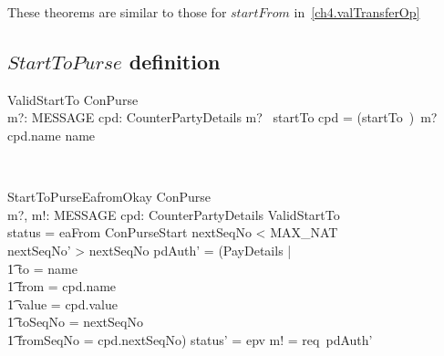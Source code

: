 These theorems are similar to those for $startFrom$ in~\ref{ch4.valTransferOp}
%



\subsection*{$StartToPurse$ definition}

\begin{LSDef}
\begin{schema}{ValidStartTo}
   ConPurse \\
   m?: MESSAGE
   \also
   cpd: CounterPartyDetails
\where
   m? \in \ran~startTo
   \also
   cpd = (startTo~\inv)~m?
   \also
   cpd.name \neq name
\end{schema}~\end{LSDef}

\begin{LSDef}
\begin{schema}{StartToPurseEafromOkay}
   \Delta ConPurse \\
   m?, m!: MESSAGE
   \also
   cpd: CounterPartyDetails
\where
   ValidStartTo \\
   status = eaFrom
   \also
   \Xi ConPurseStart
   \also
   nextSeqNo < MAX\_NAT \\
   nextSeqNo' > nextSeqNo
   \also
   pdAuth' = (\mu PayDetails | \\
      \t1 to = name \\
      \t1 \land from = cpd.name \\
      \t1 \land value = cpd.value \\
      \t1 \land toSeqNo = nextSeqNo \\
      \t1 \land fromSeqNo = cpd.nextSeqNo)
   \also
   status' = epv
   \also
   m! = req~pdAuth'
\end{schema}~\end{LSDef}

